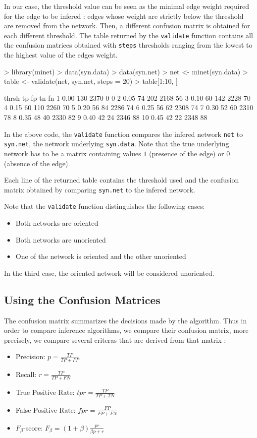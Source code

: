 \documentclass{article}
\newcommand{\Rfunction}[1]{{\texttt{#1}}}
\newcommand{\Robject}[1]{{\texttt{#1}}}
\begin{document}
In our case, the threshold value can be seen as the minimal edge weight
required for the edge to be infered : edges whose weight are strictly below 
the threshold are removed from the network. Then, a different confusion
matrix is obtained for each different threshold.
The table returned by the \Rfunction{validate} function contains all the confusion 
matrices obtained with \Robject{steps} thresholds ranging from the lowest to the 
highest value of the edges weight. 
\begin{Schunk}
\begin{Sinput}
> library(minet)
> data(syn.data)
> data(syn.net)
> net <- minet(syn.data)
> table <- validate(net, syn.net, steps = 20)
> table[1:10, ]
\end{Sinput}
\begin{Soutput}
   thrsh  tp   fp   tn fn
1   0.00 130 2370    0  0
2   0.05  74  202 2168 56
3   0.10  60  142 2228 70
4   0.15  60  110 2260 70
5   0.20  56   84 2286 74
6   0.25  56   62 2308 74
7   0.30  52   60 2310 78
8   0.35  48   40 2330 82
9   0.40  42   24 2346 88
10  0.45  42   22 2348 88
\end{Soutput}
\end{Schunk}
In the above code, the {\Rfunction{validate}} function compares the infered 
network { \Robject{net}} to {\Robject{syn.net}}, the network underlying 
{\Robject{syn.data}}. Note that the true underlying network has to be a matrix
containing values $1$ (presence of the edge) or $0$ (absence of the edge). 

Each line of the returned table contains the threshold used and the  
confusion matrix obtained by comparing \Robject{syn.net} to the infered network.

Note that the \Rfunction{validate} function distinguishes the following cases:
\begin{itemize}
      \item Both networks are oriented
      \item Both networks are unoriented
      \item One of the network is oriented and the other unoriented
\end{itemize}
In the third case, the oriented network will be considered unoriented.

\subsection{Using the Confusion Matrices}
The confusion matrix summarizes the decisions made by the algorithm. Thus in order to 
compare inference algorithms, we compare their confusion matrix, more precisely, we 
compare several criteras that are derived from that matrix \cite{prroc}: 
\begin{itemize}
	\item{Precision:} $ p = \frac{TP}{TP+FP} $
	\item{Recall:} $ r = \frac{TP}{TP+FN} $
	\item{True Positive Rate:} $ tpr = \frac{TP}{TP+TN} $
	\item{False Positive Rate:} $fpr = \frac{FP}{FP+FN} $
	\item{$F_\beta$-score:} $F_\beta = (1+\beta)\frac{pr}{\beta p + r}$
\end{itemize}
\end{document}
